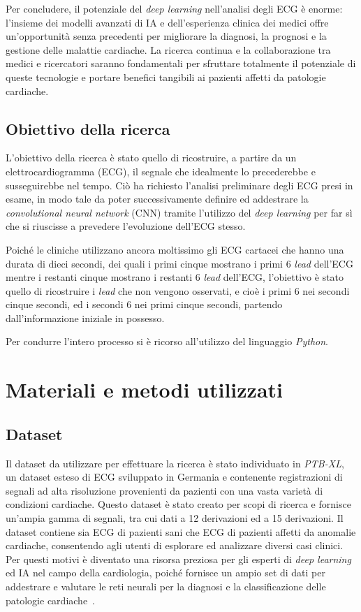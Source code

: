 Per concludere, il potenziale del \textit{deep learning} nell'analisi degli ECG è enorme: l'insieme dei modelli avanzati di IA e dell'esperienza clinica dei medici offre un'opportunità senza precedenti per migliorare la diagnosi, la prognosi e la gestione delle malattie cardiache. La ricerca continua e la collaborazione tra medici e ricercatori saranno fondamentali per sfruttare totalmente il potenziale di queste tecnologie e portare benefici tangibili ai pazienti affetti da patologie cardiache.

\section{Obiettivo della ricerca}
\label{sec:obiettivo}

L'obiettivo della ricerca è stato quello di ricostruire, a partire da un elettrocardiogramma (ECG), il segnale che idealmente lo precederebbe e susseguirebbe nel tempo. Ciò ha richiesto l'analisi preliminare degli ECG presi in esame, in modo tale da poter successivamente definire ed addestrare la \textit{convolutional neural network} (CNN) tramite l'utilizzo del \textit{deep learning} per far sì che si riuscisse a prevedere l'evoluzione dell'ECG stesso.

Poiché le cliniche utilizzano ancora moltissimo gli ECG cartacei che hanno una durata di dieci secondi, dei quali i primi cinque mostrano i primi 6 \textit{lead} dell'ECG mentre i restanti cinque mostrano i restanti 6 \textit{lead} dell'ECG, l'obiettivo è stato quello di ricostruire i \textit{lead} che non vengono osservati, e cioè i primi 6 nei secondi cinque secondi, ed i secondi 6 nei primi cinque secondi, partendo dall'informazione iniziale in possesso.

Per condurre l'intero processo si è ricorso all'utilizzo del linguaggio \textit{Python}.

\chapter{Materiali e metodi utilizzati}
\label{chap:materiali}

\section{Dataset}
\label{sec:dataset}

Il dataset da utilizzare per effettuare la ricerca è stato individuato in \textit{PTB-XL}, un dataset esteso di ECG sviluppato in Germania e contenente registrazioni di segnali ad alta risoluzione provenienti da pazienti con una vasta varietà di condizioni cardiache. Questo dataset è stato creato per scopi di ricerca e fornisce un'ampia gamma di segnali, tra cui dati a 12 derivazioni ed a 15 derivazioni. Il dataset contiene sia ECG di pazienti sani che ECG di pazienti affetti da anomalie cardiache, consentendo agli utenti di esplorare ed analizzare diversi casi clinici. Per questi motivi è diventato una risorsa preziosa per gli esperti di \textit{deep learning} ed IA nel campo della cardiologia, poiché fornisce un ampio set di dati per addestrare e valutare le reti neurali per la diagnosi e la classificazione delle patologie cardiache~\cite{datasetdistro}.

